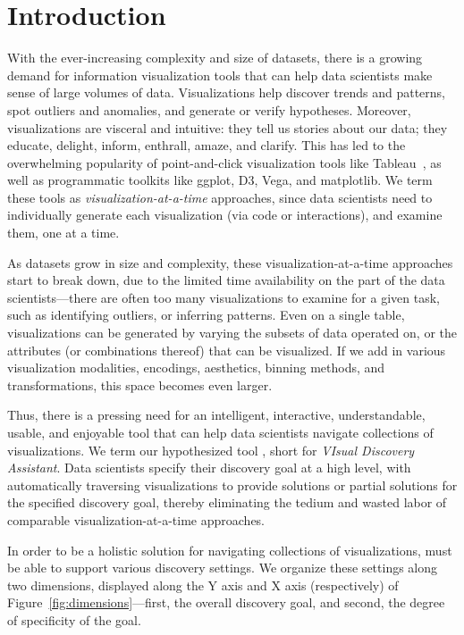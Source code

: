 \section{Introduction}%

\par 
With the ever-increasing complexity 
and size of datasets,
there is a growing demand for 
information visualization tools
that can help data scientists make sense of large
volumes of data.
Visualizations help discover 
trends and patterns, 
spot outliers and anomalies, 
and generate or verify hypotheses.
Moreover, 
visualizations are visceral and intuitive: 
they tell us stories about our data; 
they educate, delight, inform, 
enthrall, amaze, and clarify.
This has led to the overwhelming popularity
of point-and-click visualization tools like Tableau~\cite{Stolte2002},
as well as programmatic toolkits like ggplot, D3, Vega, and matplotlib. 
We term these tools as {\em visualization-at-a-time} approaches, since
data scientists need to individually 
generate each visualization (via code or interactions),
and examine them, 
one at a time.


\par
As datasets grow in size and complexity, 
these visualization-at-a-time approaches start to break down,
due to the limited time availability on the 
part of the data scientists---there 
are often too many visualizations to examine for a given 
task, such as identifying outliers, or inferring patterns. 
Even on a single table, 
visualizations can be generated
by varying the subsets of data operated on, 
or the attributes (or combinations
thereof) that can be visualized. 
If we add in various visualization modalities, encodings,
aesthetics, binning methods, and transformations,
this space becomes even larger.


\par
Thus, there is a pressing need for an 
intelligent,
interactive, understandable, usable, and
enjoyable tool that can help 
data scientists navigate
collections of visualizations.
We term our hypothesized tool \vida,
short for {\em VIsual Discovery Assistant}.
Data scientists specify their discovery
goal at a high level,
with \vida 
automatically 
traversing visualizations to provide
solutions or partial solutions for the
specified discovery goal, thereby
eliminating the tedium and wasted
labor of comparable visualization-at-a-time 
approaches.

\par
{} In order to be a holistic solution for 
navigating collections of visualizations,
\vida must be able to support various discovery
settings. 
We organize these settings along two
dimensions, displayed along the Y axis and 
X axis (respectively) of Figure~\ref{fig:dimensions}---first, 
the overall discovery goal,
and second, the degree of specificity of the goal.



